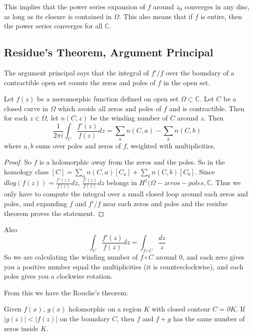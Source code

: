 \documentclass[main.tex]{subfiles}
\begin{document}
This implies that the power series expansion of $f$ around $z_0$ converges in any disc, as long as its closure is contained in $\Omega$. This also means that if $f$ is entire, then the power series converges for all $\mathbb{C}$.


\subsection{Residue's Theorem, Argument Principal}

The argument principal says that the integral of $f'/f$ over the boundary of a contractible open set counts the zeros and poles of $f$ in the open set.

\begin{theorem}
Let $f(z)$ be a meromorphic function defined on open set $\Omega \subset \mathbb{C}$. Let $C$ be a closed curve in $\Omega$ which avoids all zeros and poles of $f$ and is contractible. Then for each $z \in \Omega$, let $n(C,z)$ be the winding number of $C$ around $z$. Then 
$$
\frac{1}{2\pi i} \int_C \frac{f'(z)}{f(z)} dz = \sum_a n(C,a) - \sum_b n(C,b)
$$
where $a, b$ sums over poles and zeros of $f$, weighted with multiplicities.
\end{theorem}

\begin{proof}
So $f$ is a holomorphic away from the zeros and the poles. So in the homology class $[C] = \sum_a n(C,a) [C_a] + \sum_b n(C, b) [C_b]$. Since $d log(f(z)) =\frac{f'(z)}{f(z)} dz$, $\frac{f'(z)}{f(z)} dz$ belongs in $H^1(\Omega - zeros - poles, \mathbb{C}$. Thus we only have to compute the integral over a small closed loop around each zeros and poles, and expanding $f$ and $f'/f$ near each zeros and poles and the residue theorem proves the statement.
\end{proof}

\begin{remark}
Also 
$$
\int_C \frac{f'(z)}{f(z)} dz = \int_{f \circ C} \frac{dz}{z}
$$
So we are calculating the winding number of $f \circ C$ around $0$, and each zero gives you a positive number equal the multiplicities (it is counterclockwise), and each poles gives you a clockwise rotation.
\end{remark}

From this we have the Rouche's theorem:

\begin{theorem}
Given $f(x)$, $g(x)$ holomorphic on a region $K$ with closed contour $C = \partial K$. If $|g(z)| < |f(z)|$ on the boundary $C$, then $f$ and $f + g$ has the same number of zeros inside $K$.
\end{theorem}
\end{document}
